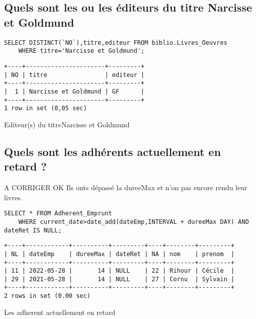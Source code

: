 \documentclass{article}
\begin{document}
\subsection{Quels sont les ou les éditeurs du titre \og Narcisse et Goldmund \fg}
\begin{listing}[H]
\begin{verbatim}
SELECT DISTINCT(`NO`),titre,editeur FROM biblio.Livres_Oeuvres
	WHERE titre='Narcisse et Goldmund';
\end{verbatim}
\begin{verbatim}
+----+----------------------+---------+
| NO | titre                | editeur |
+----+----------------------+---------+
|  1 | Narcisse et Goldmund | GF      |
+----+----------------------+---------+
1 row in set (0,05 sec)
\end{verbatim}
\caption{Editeur(s) du  titreNarcisse et Goldmund}
\end{listing}


\subsection{Quels sont les adhérents actuellement en retard ?}
A CORRIGER OK
Ils onts dépassé la dureeMax et n'on pas encore rendu leur livres.
\begin{listing}[H]
\begin{verbatim}
SELECT * FROM Adherent_Emprunt
    WHERE current_date>date_add(dateEmp,INTERVAL + dureeMax DAY) AND dateRet IS NULL;
\end{verbatim}
\begin{verbatim}
+----+------------+----------+---------+----+--------+---------+
| NL | dateEmp    | dureeMax | dateRet | NA | nom    | prenom  |
+----+------------+----------+---------+----+--------+---------+
| 11 | 2022-05-28 |       14 | NULL    | 22 | Rihour | Cécile  |
| 29 | 2021-05-28 |       14 | NULL    | 27 | Cornu  | Sylvain |
+----+------------+----------+---------+----+--------+---------+
2 rows in set (0.00 sec)
\end{verbatim}
\caption{Les adherent actuellement en retard}
\end{listing}
\end{document}
